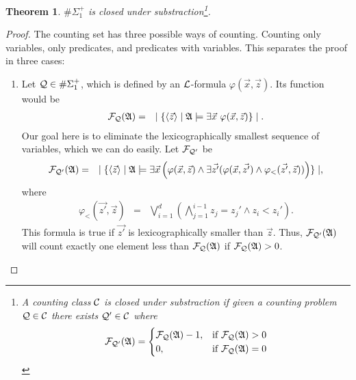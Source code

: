 \documentclass[12pt]{article}
\def\A{{\frak A}}
\def\C{{\cal C}}
\def\L{{\cal L}}
\def\Q{{\cal Q}}
\def\F{{\cal F}}
\def\x{\vec{x}}
\def\z{\vec{z}}
\newtheorem{theo}{Theorem}
\begin{document}
\begin{theo}
$\#\Sigma_1^+$ is closed under substraction\footnote[1]{A counting class $\C$ is closed under substraction if given a counting problem $\Q \in \C$ there exists $\Q' \in \C$ where $$
\F_{\Q'}(\A) =
\begin{cases}
\F_\Q(\A)-1, & \text{if }\F_{\Q}(\A) > 0 \\
0, & \text{if }\F_{\Q}(\A) = 0 
\end{cases}
$$ }.
\end{theo}
\begin{proof}
The counting set has three possible ways of counting. Counting only variables, only predicates, and predicates with variables. This separates the proof in three cases:
\begin{enumerate}


\item Let $\Q \in \#\Sigma_1^+$, which is defined by an $\L$-formula $\varphi(\x,\z)$. Its function would be
\begin{eqnarray*}
\F_\Q(\A) &=& \mid \{ \langle\z\rangle \mid \A \models \exists \x \ \varphi(\x,\z) \} \mid.
\end{eqnarray*}
Our goal here is to eliminate the lexicographically smallest sequence of variables, which we can do easily. Let $\F_{\Q'}$ be
\begin{eqnarray*}
\F_{\Q'}(\A) &=& \mid \{ \langle\z\rangle \mid \A \models \exists \x\left( \varphi(\x,\z) \wedge \exists \vec{z'} (\varphi(\x,\vec{z'}) \wedge \varphi_<(\vec{z'},\z ) ) \right) \} \mid,
\end{eqnarray*}
where
\begin{eqnarray*}
\varphi_<(\vec{z'},\z) &=& \bigvee_{i = 1}^d \left( \bigwedge_{j=1}^{i-1} z_j = z_j' \wedge z_i < z_i' \right).
\end{eqnarray*}
This formula is true if $\vec{z'}$ is lexicographically smaller than $\z$. Thus, $\F_{\Q'}(\A)$ will count exactly one element less than $\F_\Q(\A)$ if $\F_\Q(\A)>0$.



\end{enumerate}
\end{proof}
\end{document}

